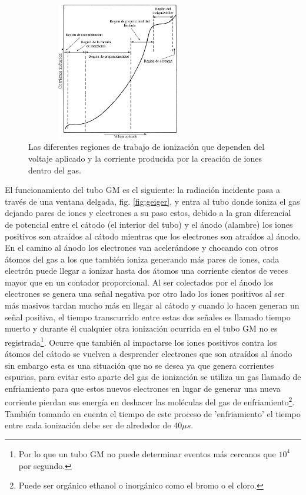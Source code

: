 \documentclass[letterpaper,10pt,twocolumn]{article}
\numberwithin{equation}{section}
\newcommand{\espaciocaps}{\setlength{\abovecaptionskip}{2pt}
  \setlength{\belowcaptionskip}{0pt}}
\begin{document}
\begin{figure}[H]
  \espaciocaps
  \centering
  \includegraphics[width=8cm,height=6cm]{regiones}
  \caption{Las diferentes regiones de trabajo de ionización que dependen del voltaje aplicado
    y la corriente producida por la creación de iones dentro del gas.} 
  \label{fig:regiones}
\end{figure}

El funcionamiento del tubo GM es el siguiente: la radiación incidente pasa a través de una
ventana delgada, fig. \ref{fig:geiger}, y entra al tubo donde ioniza el gas dejando pares de
iones y electrones a su paso estos, debido a la gran diferencial de potencial entre el cátodo
(el interior del tubo) y el ánodo (alambre) los iones positivos son atraídos al cátodo
mientras que los electrones son atraídos al ánodo. En el camino al ánodo los electrones van
acelerándose y chocando con otros átomos del gas a los que también ioniza generando más pares
de iones, cada electrón puede llegar a ionizar hasta dos átomos una corriente cientos de
veces mayor que en un contador proporcional. Al ser colectados por el ánodo los electrones se
genera una señal negativa por otro lado los iones positivos al ser más masivos tardan mucho
más en llegar al cátodo y cuando lo hacen generan un señal positiva, el tiempo transcurrido
entre estas dos señales es llamado tiempo muerto y durante él cualquier otra ionización
ocurrida en el tubo GM no es registrada\footnote{Por lo que un tubo GM no puede determinar
  eventos más cercanos que $10^{4}$ por segundo.}. Ocurre que también al impactarse los iones 
positivos contra los átomos del cátodo se vuelven a desprender electrones que son atraídos al
ánodo sin embargo esta es una situación que no se desea ya que genera corrientes espurias,
para evitar esto aparte del gas de ionización se utiliza un gas llamado de enfriamiento para
que estos nuevos electrones en lugar de generar una nueva corriente pierdan sus energía en
deshacer las moléculas del gas de enfriamiento\footnote{Puede ser orgánico ethanol o
  inorgánico como el bromo o el cloro.}. También tomando en cuenta el tiempo de este proceso
de 'enfriamiento' el tiempo entre cada ionización debe ser de alrededor de $40 \mu
s$.\cite{littlefield} 
\end{document}
